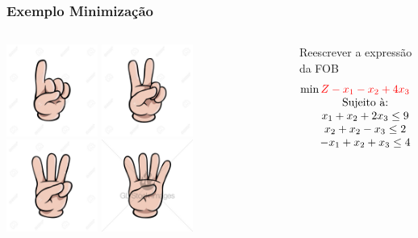\begin{frame}
	\frametitle{Exemplo Minimização}
	\begin{columns}
		\begin{column}{0.3\textwidth}
			\only<1>
			{
				\includegraphics[width=3cm,height=3cm]{number_1.jpg}
			}
			\only<2>
			{
				\includegraphics[width=3cm,height=3cm]{number_2.jpg}
			}
			\only<3>
			{
				\includegraphics[width=3cm,height=3cm]{number_3.jpg}
			}
			\only<4>
			{
				\includegraphics[width=3cm,height=3cm]{number_4.jpg}
			}
		\end{column}
 		\begin{column}{0.7\textwidth}
	 		\only<1>
	 		{	
		 		\begin{block}{Reescrever a expressão da FOB}
					\begin{equation*}
						\begin{matrix}
							\min { \color{red}Z - x_1 - x_2 + 4x_3 = 0} \\
							\text{Sujeito à:} \\
							x_1 + x_2 + 2x_3 \le 9 \\
							x_2 + x_2 - x_3 \le 2 \\
							-x_1 + x_2 + x_3 \le 4 \\

\end{matrix}
\end{equation*}
\end{block}}
\end{column}
\end{columns}
\end{frame}
